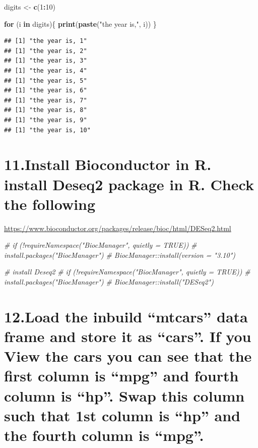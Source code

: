 \documentclass[]{article}
\newenvironment{Shaded}{\begin{snugshade}}{\end{snugshade}}
\newcommand{\CommentTok}[1]{\textcolor[rgb]{0.56,0.35,0.01}{\textit{#1}}}
\newcommand{\ControlFlowTok}[1]{\textcolor[rgb]{0.13,0.29,0.53}{\textbf{#1}}}
\newcommand{\DecValTok}[1]{\textcolor[rgb]{0.00,0.00,0.81}{#1}}
\newcommand{\KeywordTok}[1]{\textcolor[rgb]{0.13,0.29,0.53}{\textbf{#1}}}
\newcommand{\NormalTok}[1]{#1}
\newcommand{\OperatorTok}[1]{\textcolor[rgb]{0.81,0.36,0.00}{\textbf{#1}}}
\newcommand{\StringTok}[1]{\textcolor[rgb]{0.31,0.60,0.02}{#1}}
\begin{document}
\begin{Shaded}
\begin{Highlighting}[]
\NormalTok{digits <-}\StringTok{ }\KeywordTok{c}\NormalTok{(}\DecValTok{1}\OperatorTok{:}\DecValTok{10}\NormalTok{)}

\ControlFlowTok{for}\NormalTok{ (i }\ControlFlowTok{in}\NormalTok{ digits)\{}
  \KeywordTok{print}\NormalTok{(}\KeywordTok{paste}\NormalTok{(}\StringTok{"the year is,"}\NormalTok{, i))}
\NormalTok{\}}
\end{Highlighting}
\end{Shaded}

\begin{verbatim}
## [1] "the year is, 1"
## [1] "the year is, 2"
## [1] "the year is, 3"
## [1] "the year is, 4"
## [1] "the year is, 5"
## [1] "the year is, 6"
## [1] "the year is, 7"
## [1] "the year is, 8"
## [1] "the year is, 9"
## [1] "the year is, 10"
\end{verbatim}

\hypertarget{install-bioconductor-in-r.-install-deseq2-package-in-r.-check-the-following}{%
\section{11.Install Bioconductor in R. install Deseq2 package in R.
Check the
following}\label{install-bioconductor-in-r.-install-deseq2-package-in-r.-check-the-following}}

\url{https://www.bioconductor.org/packages/release/bioc/html/DESeq2.html}

\begin{Shaded}
\begin{Highlighting}[]
\CommentTok{# if (!requireNamespace("BiocManager", quietly = TRUE))}
\CommentTok{#    install.packages("BiocManager")}
\CommentTok{# BiocManager::install(version = "3.10")}

\CommentTok{# install Deseq2}
\CommentTok{# if (!requireNamespace("BiocManager", quietly = TRUE))}
\CommentTok{#    install.packages("BiocManager")}
\CommentTok{# BiocManager::install("DESeq2")}
\end{Highlighting}
\end{Shaded}

\hypertarget{load-the-inbuild-mtcars-data-frame-and-store-it-as-cars.-if-you-view-the-cars-you-can-see-that-the-first-column-is-mpg-and-fourth-column-is-hp.-swap-this-column-such-that-1st-column-is-hp-and-the-fourth-column-is-mpg.}{%
\section{12.Load the inbuild ``mtcars'' data frame and store it as
``cars''. If you View the cars you can see that the first column is
``mpg'' and fourth column is ``hp''. Swap this column such that 1st
column is ``hp'' and the fourth column is
``mpg''.}\label{load-the-inbuild-mtcars-data-frame-and-store-it-as-cars.-if-you-view-the-cars-you-can-see-that-the-first-column-is-mpg-and-fourth-column-is-hp.-swap-this-column-such-that-1st-column-is-hp-and-the-fourth-column-is-mpg.}}
\end{document}

